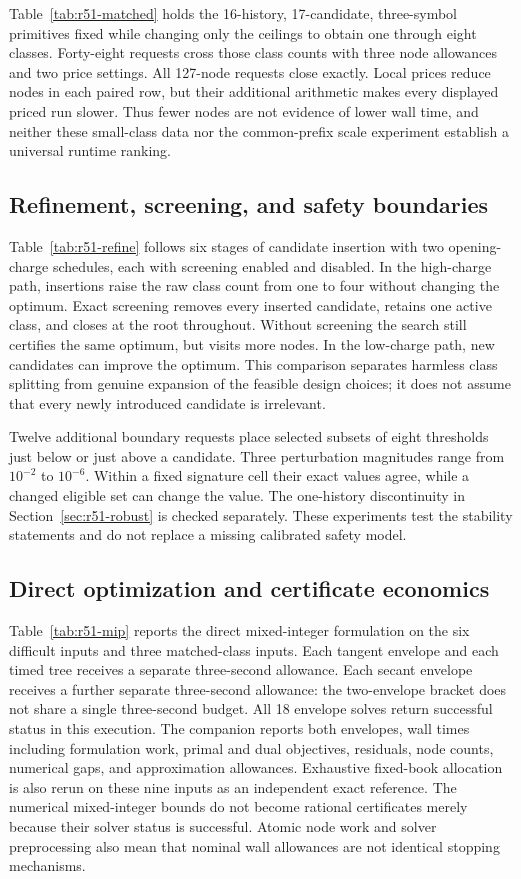 Table~\ref{tab:r51-matched} holds the 16-history, 17-candidate, three-symbol primitives fixed while changing only the ceilings to obtain one through eight classes. Forty-eight requests cross those class counts with three node allowances and two price settings. All 127-node requests close exactly. Local prices reduce nodes in each paired row, but their additional arithmetic makes every displayed priced run slower. Thus fewer nodes are not evidence of lower wall time, and neither these small-class data nor the common-prefix scale experiment establish a universal runtime ranking.

\subsection{Refinement, screening, and safety boundaries}
Table~\ref{tab:r51-refine} follows six stages of candidate insertion with two opening-charge schedules, each with screening enabled and disabled. In the high-charge path, insertions raise the raw class count from one to four without changing the optimum. Exact screening removes every inserted candidate, retains one active class, and closes at the root throughout. Without screening the search still certifies the same optimum, but visits more nodes. In the low-charge path, new candidates can improve the optimum. This comparison separates harmless class splitting from genuine expansion of the feasible design choices; it does not assume that every newly introduced candidate is irrelevant.

Twelve additional boundary requests place selected subsets of eight thresholds just below or just above a candidate. Three perturbation magnitudes range from $10^{-2}$ to $10^{-6}$. Within a fixed signature cell their exact values agree, while a changed eligible set can change the value. The one-history discontinuity in Section~\ref{sec:r51-robust} is checked separately. These experiments test the stability statements and do not replace a missing calibrated safety model.

\subsection{Direct optimization and certificate economics}
Table~\ref{tab:r51-mip} reports the direct mixed-integer formulation on the six difficult inputs and three matched-class inputs. Each tangent envelope and each timed tree receives a separate three-second allowance. Each secant envelope receives a further separate three-second allowance: the two-envelope bracket does not share a single three-second budget. All 18 envelope solves return successful status in this execution. The companion reports both envelopes, wall times including formulation work, primal and dual objectives, residuals, node counts, numerical gaps, and approximation allowances. Exhaustive fixed-book allocation is also rerun on these nine inputs as an independent exact reference. The numerical mixed-integer bounds do not become rational certificates merely because their solver status is successful. Atomic node work and solver preprocessing also mean that nominal wall allowances are not identical stopping mechanisms.

